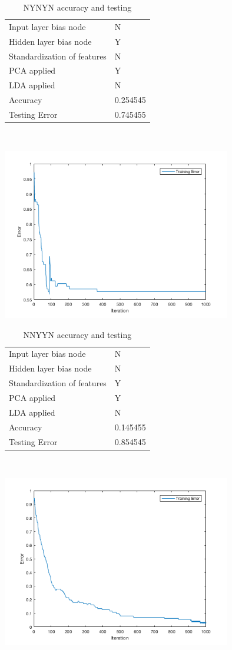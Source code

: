 \documentclass[12pt]{article}
\newcommand{\accuracyAndTestErrorTable}[8]{
  \begin{tabular}{l|l}
    \hline
    Input layer bias node & #1 \\
    Hidden layer bias node & #2 \\
    Standardization of features & #3 \\
    PCA applied & #4 \\
    LDA applied & #5 \\
    \hline
    Accuracy & #6 \\
    Testing Error & #7 \\
    \hline
  \end{tabular}
  ~\\[60pt]
  \caption{#8}
}
\begin{document}
\begin{center}
  \begin{table}[H]
    \begin{varwidth}[b]{0.4\linewidth}
      \centering
      \accuracyAndTestErrorTable{N}{Y}{N}{Y}{N}{0.254545}{0.745455}{NYNYN accuracy and testing}
      \label{table:NYNYN}
    \end{varwidth}%
    \hfill
    \begin{minipage}[b]{0.6\linewidth}
      \centering
      \includegraphics[width=100mm]{NYNYN_training_error.png}
      \label{fig:NYNYN}
    \end{minipage}
  \end{table}
\end{center}




\begin{center}
  \begin{table}[H]
    \begin{varwidth}[b]{0.4\linewidth}
      \centering
      \accuracyAndTestErrorTable{N}{N}{Y}{Y}{N}{0.145455}{0.854545}{NNYYN accuracy and testing}
      \label{table:NNYYN}
    \end{varwidth}%
    \hfill
    \begin{minipage}[b]{0.6\linewidth}
      \centering
      \includegraphics[width=100mm]{NNYYN_training_error.png}
      \label{fig:NNYYN}
    \end{minipage}
  \end{table}
\end{center}
\end{document}
